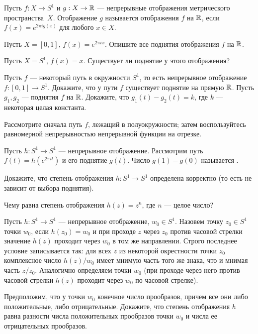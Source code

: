 \documentclass[a4paper,12pt]{article}
\newcommand{\0}[1]{\overline{#1}}
\begin{document}
Пусть $f:X\to S^1$ и $g:X\rightarrow \mathbb{R}$ --- непрерывные отображения
метрического пространства~$X$.
Отображение $g$ называется  отображения $f$ на $\mathbb{R}$,
если $f(x)=e^{2\pi ig(x)}$ для любого $x\in X$.

Пусть $X=[0,1]$, $f(x)=e^{2\pi ix}$. Опишите все
поднятия отображения $f$ на $\mathbb{R}$.

Пусть $X=S^1$, $f(x)=x$. Существует ли поднятие у этого отображения?




Пусть $f$ --- некоторый путь в окружности $S^1$, то есть непрерывное
отображение $f:[0,1]\to S^1$.
Докажите, что у пути $f$ существует поднятие на прямую $\mathbb{R}$.
Пусть $g_1,g_2$ --- поднятия $f$ на $\mathbb{R}$.
Докажите, что $g_1(t)-g_2(t)=k$, где $k$ --- некоторая целая константа.


 Рассмотрите сначала путь $f$, лежащий в
полуокружности; затем  воспользуйтесь равномерной непрерывностью
непрерывной функции на отрезке.


Пусть $h:S^1\to S^1$ --- непрерывное отображение. Рассмотрим путь
$f(t)=h(e^{2\pi it})$ и его поднятие $g(t)$. Число $g(1)-g(0)$
называется .

Докажите, что степень отображения $h:S^1\to S^1$
определена корректно (то есть не зависит от выбора поднятия).

Чему равна степень отображения $h(z)=z^n$, где $n$ --- целое число?





Пусть $h:S^1\to S^1$ --- непрерывное отображение, $w_0\in S^1$. Назовем
точку $z_0\in S^1$  точки $w_0$, если
$h(z_0)=w_0$ и при проходе $z$ через $z_0$ против часовой стрелки
значение $h(z)$ проходит через $w_0$ в том же направлении. Строго
последнее условие записывается так: для всех $z$ из некоторой
окрестности точки $z_0$ комплексное число
$h(z)/w_0$ имеет мнимую часть того же знака, что и мнимая часть $z/z_0$.
Аналогично определяем  точки $w_0$ (при
проходе через него против часовой стрелки $h(z)$ проходит через $w_0$ по
часовой стрелке).

Предположим, что у точки $w_0$ конечное число прообразов, причем все они
либо положительные, либо отрицательные. Докажите, что степень
отображения $h$ равна разности числа положительных прообразов точки $w_0$
и числа ее отрицательных прообразов.
\end{document}
